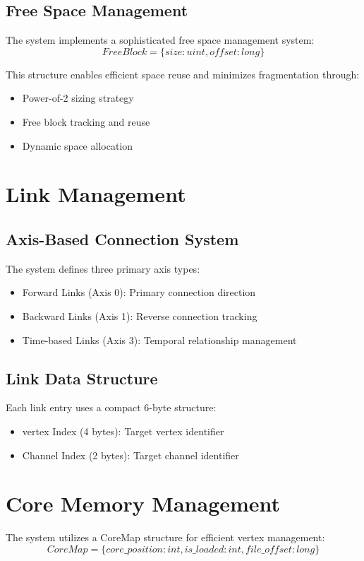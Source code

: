 \subsection{Free Space Management}
The system implements a sophisticated free space management system:
\begin{equation}
    FreeBlock = \{size: uint, offset: long\}
\end{equation}

This structure enables efficient space reuse and minimizes fragmentation through:
\begin{itemize}
    \item Power-of-2 sizing strategy
    \item Free block tracking and reuse
    \item Dynamic space allocation
\end{itemize}

\section{Link Management}\label{Sec:Links}
\subsection{Axis-Based Connection System}
The system defines three primary axis types:
\begin{itemize}
    \item Forward Links (Axis 0): Primary connection direction
    \item Backward Links (Axis 1): Reverse connection tracking
    \item Time-based Links (Axis 3): Temporal relationship management
\end{itemize}

\subsection{Link Data Structure}
Each link entry uses a compact 6-byte structure:
\begin{itemize}
    \item vertex Index (4 bytes): Target vertex identifier
    \item Channel Index (2 bytes): Target channel identifier
\end{itemize}

\section{Core Memory Management}\label{Sec:CoreMemory}
The system utilizes a CoreMap structure for efficient vertex management:
\begin{equation}
    CoreMap = \{core\_position: int, is\_loaded: int, file\_offset: long\}
\end{equation}

